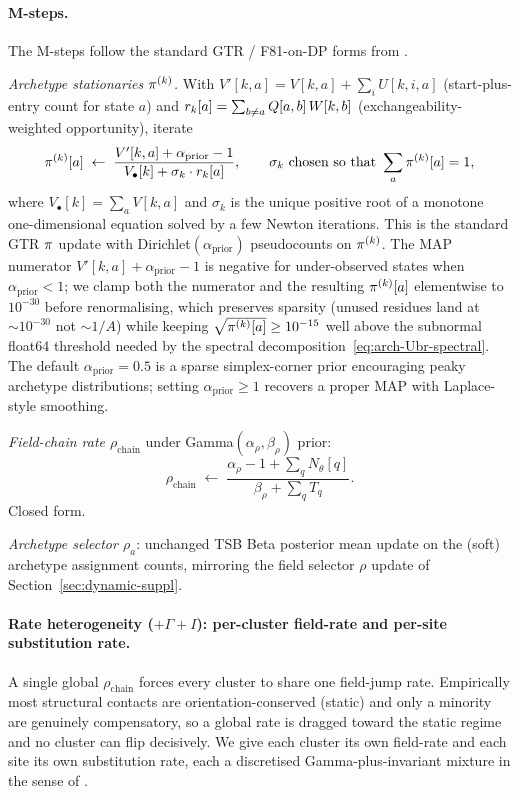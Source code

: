 \paragraph{M-steps.}
The M-steps follow the standard GTR / F81-on-DP forms from
\citet{HolmesRubin2002, Bruno1996}.

\emph{Archetype stationaries $\pi^{(k)}$.} With
$V'[k, a] = V[k, a] + \sum_i U[k, i, a]$ (start-plus-entry count for
state $a$) and $r_k[a] = \sum_{b \ne a} Q[a, b]\, W[k, b]$
(exchangeability-weighted opportunity), iterate
\begin{equation}
  \pi^{(k)}[a] \;\leftarrow\; \frac{V'[k, a] + \alpha_{\text{prior}} - 1}
                                    {V_\bullet[k] + \sigma_k \cdot r_k[a]},
  \qquad \sigma_k\ \text{chosen so that } \sum_a \pi^{(k)}[a] = 1,
  \label{eq:arch-Mstep-pi}
\end{equation}
where $V_\bullet[k] = \sum_a V[k, a]$ and $\sigma_k$ is the unique
positive root of a monotone one-dimensional equation solved by a few
Newton iterations. This is the standard GTR $\pi$ update with
Dirichlet$(\alpha_{\text{prior}})$ pseudocounts on $\pi^{(k)}$. The
MAP numerator $V'[k, a] + \alpha_{\text{prior}} - 1$ is negative for
under-observed states when $\alpha_{\text{prior}} < 1$; we clamp both
the numerator and the resulting $\pi^{(k)}[a]$ elementwise to $10^{-30}$
before renormalising, which preserves sparsity (unused residues land
at $\sim\!10^{-30}$ not $\sim\!1/A$) while keeping
$\sqrt{\pi^{(k)}[a]} \geq 10^{-15}$ well above the subnormal float64
threshold needed by the spectral decomposition~\eqref{eq:arch-Ubr-spectral}.
The default $\alpha_{\text{prior}} = 0.5$ is a sparse simplex-corner
prior encouraging peaky archetype distributions; setting
$\alpha_{\text{prior}} \geq 1$ recovers a proper MAP with Laplace-style
smoothing.

\emph{Field-chain rate $\rho_{\text{chain}}$} under
Gamma$(\alpha_\rho, \beta_\rho)$ prior:
\begin{equation}
  \rho_{\text{chain}} \;\leftarrow\;
    \frac{\alpha_\rho - 1 + \sum_q N_\theta[q]}
         {\beta_\rho + \sum_q T_q}.
  \label{eq:arch-Mstep-rho}
\end{equation}
Closed form.

\emph{Archetype selector $\rho_a$}: unchanged TSB Beta posterior mean
update on the (soft) archetype assignment counts, mirroring the field
selector $\rho$ update of Section~\ref{sec:dynamic-suppl}.

\paragraph{Rate heterogeneity ($+\Gamma+I$): per-cluster field-rate and
per-site substitution rate.}
\label{par:rate-het}
A single global $\rho_{\text{chain}}$ forces every cluster to share one
field-jump rate. Empirically most structural contacts are
orientation-conserved (static) and only a minority are genuinely
compensatory, so a global rate is dragged toward the static regime and
no cluster can flip decisively. We give each cluster its own field-rate
and each site its own substitution rate, each a discretised
Gamma-plus-invariant mixture in the sense of
\citet{yang1994maximum, yang1996among}.

